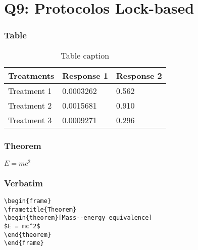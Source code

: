 \documentclass{beamer}
\begin{document}
\section{Q9: Protocolos Lock-based}

\begin{frame}
\frametitle{Table}
\begin{table}
\begin{tabular}{l l l}
\toprule
\textbf{Treatments} & \textbf{Response 1} & \textbf{Response 2}\\
\midrule
Treatment 1 & 0.0003262 & 0.562 \\
Treatment 2 & 0.0015681 & 0.910 \\
Treatment 3 & 0.0009271 & 0.296 \\
\bottomrule
\end{tabular}
\caption{Table caption}
\end{table}
\end{frame}


\begin{frame}
\frametitle{Theorem}
\begin{theorem}
$E = mc^2$
\end{theorem}
\end{frame}


\begin{frame}[fragile] %
\frametitle{Verbatim}
\begin{example}
\begin{verbatim}
\begin{frame}
\frametitle{Theorem}
\begin{theorem}[Mass--energy equivalence]
$E = mc^2$
\end{theorem}
\end{frame}\end{verbatim}
\end{example}
\end{frame}
\end{document}
